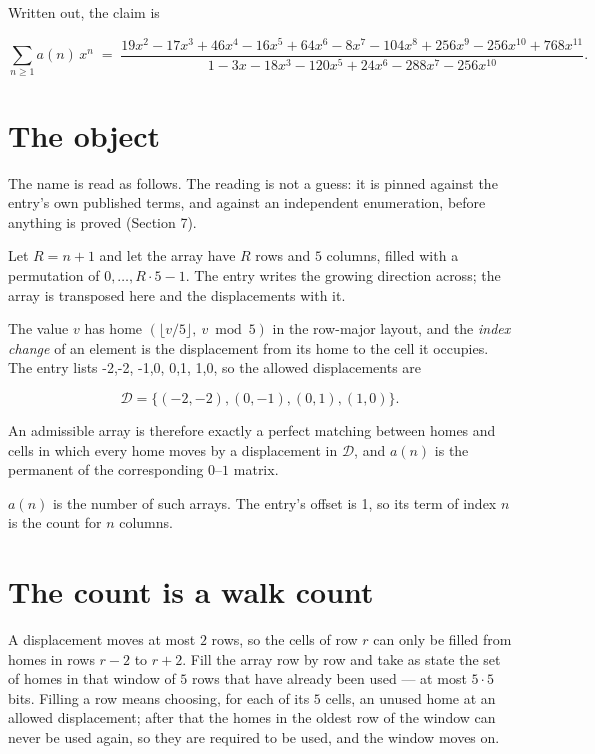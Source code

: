 \documentclass[11pt]{article}
\theoremstyle{definition}
\begin{document}
Written out, the claim is

\[\sum_{n \ge 1} a(n)\,x^n \;=\; \frac{19x^{2} - 17x^{3} + 46x^{4} - 16x^{5} + 64x^{6} - 8x^{7} - 104x^{8} + 256x^{9} - 256x^{10} + 768x^{11}}{1 - 3x - 18x^{3} - 120x^{5} + 24x^{6} - 288x^{7} - 256x^{10}}.\]

\section{The object}

The name is read as follows. The reading is not a guess: it is pinned against the entry's own published terms, and against an independent enumeration, before anything is proved (Section 7).

Let $R = n + 1$ and let the array have $R$ rows and $5$ columns, filled with a permutation of $0,\dots,R\cdot5-1$. The entry writes the growing direction across; the array is transposed here and the displacements with it.

The value $v$ has home $(\lfloor v/5\rfloor,\ v \bmod 5)$ in the row-major layout, and the {\itshape index change} of an element is the displacement from its home to the cell it occupies. The entry lists -2,-2, -1,0, 0,1, 1,0, so the allowed displacements are

\[\mathcal{D} = \{(-2,-2), (0,-1), (0,1), (1,0)\}.\]

An admissible array is therefore exactly a perfect matching between homes and cells in which every home moves by a displacement in $\mathcal{D}$, and $a(n)$ is the permanent of the corresponding $0$--$1$ matrix.

$a(n)$ is the number of such arrays. The entry's offset is 1, so its term of index $n$ is the count for $n$ columns.

\section{The count is a walk count}

A displacement moves at most $2$ rows, so the cells of row $r$ can only be filled from homes in rows $r-2$ to $r+2$. Fill the array row by row and take as state the set of homes in that window of $5$ rows that have already been used --- at most $5\cdot5$ bits. Filling a row means choosing, for each of its $5$ cells, an unused home at an allowed displacement; after that the homes in the oldest row of the window can never be used again, so they are required to be used, and the window moves on.
\end{document}
